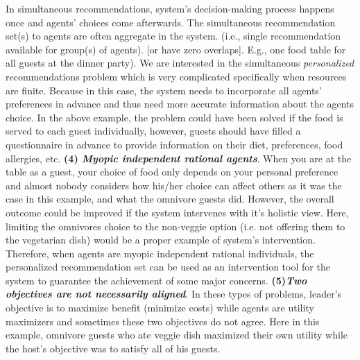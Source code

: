 \documentclass[11pt, letterpaper]{article}
\begin{document}
In simultaneous recommendations, system's decision-making process happens once and agents' choices come afterwards. The simultaneous recommendation set(s) to agents are often aggregate in the system. (i.e., single recommendation available for group(s) of agents). [or have zero overlaps]. E.g., one food table for all guests at the dinner party).
We are interested in the simultaneous \emph{personalized} recommendations problem which is very complicated specifically when resources are finite. Because
in this case, the system needs to incorporate all agents' preferences in advance and thus need more accurate information about the agents choice. 
In the above example, the problem could have been solved if the food is served to each guest individually, however, guests should have filled a questionnaire in advance to provide information on their diet, preferences, food allergies, etc.  \textbf{(4) \emph{Myopic independent rational agents}}. When you are at the table as a guest, your choice of food only depends on your personal preference and almost nobody considers how his/her choice can affect others as it was the case in this example, and what the omnivore guests did. However, the overall outcome could be improved if the system intervenes with it's holistic view. Here, limiting the omnivores choice to the non-veggie option (i.e. not offering them to the vegetarian dish) would be a proper example of system's intervention.
Therefore, when agents are myopic independent rational individuals, the personalized recommendation set can be used as an intervention tool for the system to guarantee the achievement of some major concerns.
\textbf{(5)\emph{Two objectives are not necessarily aligned}}. In these types of problems, leader's objective is to maximize benefit (minimize costs) while agents are utility maximizers and sometimes these two objectives do not agree. Here in this example, omnivore guests who ate veggie dish maximized their own utility while the host's objective was to satisfy all of his guests.  
\end{document}
